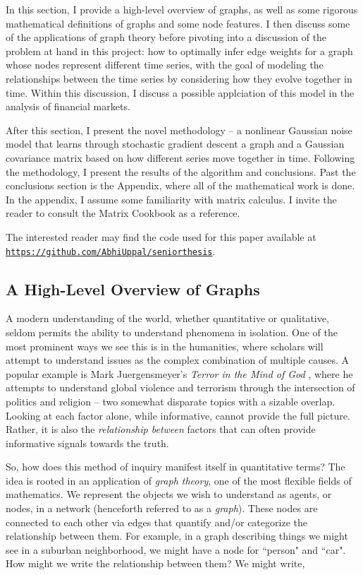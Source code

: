 \documentclass{article}
\theoremstyle{definition}
\begin{document}
In this section, I provide a high-level overview of graphs, as well as some rigorous mathematical definitions of graphs and some node features. I then discuss some of the applications of graph theory before pivoting into a discussion of the problem at hand in this project: how to optimally infer edge weights for a graph whose nodes represent different time series, with the goal of modeling the relationships between the time series by considering how they evolve together in time. Within this discussion, I discuss a possible applciation of this model in the analysis of financial markets. 

After this section, I present the novel methodology -- a nonlinear Gaussian noise model that learns through stochastic gradient descent a graph and a Gaussian covariance matrix based on how different series move together in time. Following the methodology, I present the results of the algorithm and conclusions. Past the conclusions section is the Appendix, where all of the mathematical work is done. In the appendix, I assume some familiarity with matrix calculus. I invite the reader to consult the Matrix Cookbook \cite{matrixCookbook} as a reference.

The interested reader may find the code used for this paper available at \href{https://github.com/AbhiUppal/seniorthesis}{\texttt{https://github.com/AbhiUppal/seniorthesis}}.

\subsection{A High-Level Overview of Graphs}
\label{sec:graphOverview}

A modern understanding of the world, whether quantitative or qualitative, seldom permits the ability to understand phenomena in isolation. One of the most prominent ways we see this is in the humanities, where scholars will attempt to understand issues as the complex combination of multiple causes. A popular example is Mark Juergensmeyer's \textit{Terror in the Mind of God} \cite{terrorInTheMindOfGod}, where he attempts to understand global violence and terrorism through the intersection of politics and religion -- two somewhat disparate topics with a sizable overlap. Looking at each factor alone, while informative, cannot provide the full picture. Rather, it is also the \textit{relationship between} factors that can often provide informative signals towards the truth.

So, how does this method of inquiry manifest itself in quantitative terms? The idea is rooted in an application of \textit{graph theory}, one of the most flexible fields of mathematics. We represent the objects we wish to understand as agents, or nodes, in a network (henceforth referred to as a \textit{graph}). These nodes are connected to each other via edges that quantify and/or categorize the relationship between them. For example, in a graph describing things we might see in a suburban neighborhood, we might have a node for ``person" and ``car". How might we write the relationship between them? We might write,
\end{document}
